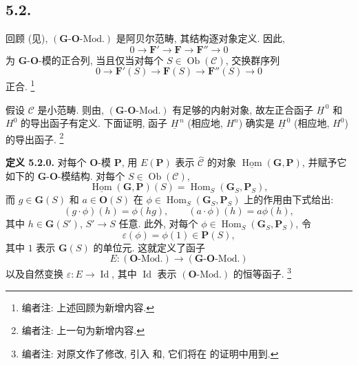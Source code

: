 \subsection*{5.2.}

回顾 (见),
\((\mathbf G\text{-}\mathbf O\text{-Mod.})\) 是阿贝尔范畴,
其结构逐对象定义. 因此,
\[
  0\longrightarrow\mathbf F'
   \longrightarrow\mathbf F
   \longrightarrow\mathbf F''
   \longrightarrow0
\]
为 \(\mathbf G\)-\(\mathbf O\)-模的正合列, 当且仅当对每个
\(S\in\operatorname{Ob}(\mathscr C)\), 交换群序列
\[
  0\longrightarrow\mathbf F'(S)
   \longrightarrow\mathbf F(S)
   \longrightarrow\mathbf F''(S)
   \longrightarrow0
\]
正合.
\footnote{编者注: 上述回顾为新增内容.}

假设 \(\mathscr C\) 是小范畴. 则由,
\((\mathbf G\text{-}\mathbf O\text{-Mod.})\) 有足够的内射对象,
故左正合函子 \(\underline H^{\,0}\) 和 \(H^0\) 的导出函子有定义.
下面证明, 函子 \(\underline H^{\,n}\) (相应地, \(H^n\))
确实是 \(\underline H^{\,0}\) (相应地, \(H^0\)) 的导出函子.
\footnote{编者注: 上一句为新增内容.}

\medskip
\noindent{}\textbf{定义 5.2.0.}
对每个 \(\mathbf O\)-模 \(\mathbf P\), 用 \(E(\mathbf P)\) 表示
\(\widehat{\mathscr C}\) 的对象 \(\underline{\operatorname{Hom}}(\mathbf G,\mathbf P)\),
并赋予它如下的 \(\mathbf G\)-\(\mathbf O\)-模结构. 对每个
\(S\in\operatorname{Ob}(\mathscr C)\),
\[
  \underline{\operatorname{Hom}}(\mathbf G,\mathbf P)(S)
    =\operatorname{Hom}_S(\mathbf G_S,\mathbf P_S),
\]
而 \(g\in\mathbf G(S)\) 和 \(a\in\mathbf O(S)\) 在
\(\phi\in\operatorname{Hom}_S(\mathbf G_S,\mathbf P_S)\) 上的作用由下式给出:
\[
  (g\cdot\phi)(h)=\phi(hg),
  \qquad
  (a\cdot\phi)(h)=a\phi(h),
\]
其中 \(h\in\mathbf G(S')\), \(S'\to S\) 任意. 此外, 对每个
\(\phi\in\operatorname{Hom}_S(\mathbf G_S,\mathbf P_S)\), 令
\[
  \varepsilon(\phi)=\phi(1)\in\mathbf P(S),
\]
其中 \(1\) 表示 \(\mathbf G(S)\) 的单位元.
这就定义了函子
\[
  E:(\mathbf O\text{-Mod.})
    \longrightarrow(\mathbf G\text{-}\mathbf O\text{-Mod.})
\]
以及自然变换 \(\varepsilon:E\to\operatorname{Id}\), 其中
\(\operatorname{Id}\) 表示 \((\mathbf O\text{-Mod.})\) 的恒等函子.
\footnote{编者注: 对原文作了修改, 引入
 和,
它们将在 的证明中用到.}

